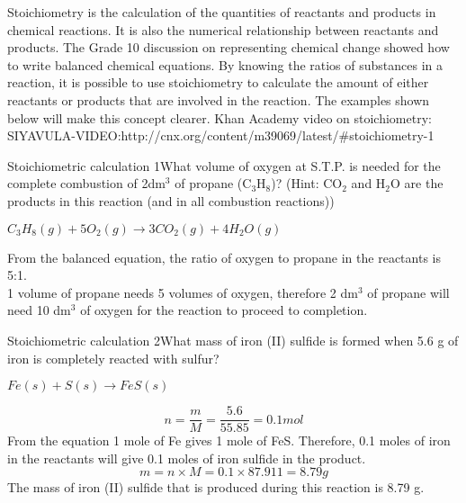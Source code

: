 Stoichiometry is the calculation of the quantities of reactants and products in chemical reactions. It is also the numerical relationship between reactants and products. The Grade 10 discussion on representing chemical change%
 showed how to write balanced chemical equations. By knowing the ratios of substances in a reaction, it is possible to use stoichiometry to calculate the amount of either reactants or products that are involved in the reaction. The examples shown below will make this concept clearer.
Khan Academy video on stoichiometry: SIYAVULA-VIDEO:http://cnx.org/content/m39069/latest/#stoichiometry-1
\begin{wex}{Stoichiometric calculation 1}{What volume of oxygen at S.T.P. is needed for the complete combustion of 2dm$^{3}$ of propane (C$_{3}$H$_{8}$)? (Hint: CO$_{2}$ and H$_{2}$O are the products in this reaction (and in all combustion reactions))\\}

{
\begin{center}
\rm${C_{3}H_{8}(g) + 5O_{2}(g) \rightarrow 3CO_{2}(g) + 4H_{2}O(g)}$\\
\end{center}


From the balanced equation, the ratio of oxygen to propane in the reactants is 5:1. \\

1 volume of propane needs 5 volumes of oxygen, therefore 2 dm$^{3}$ of propane will need 10 dm$^{3}$ of oxygen for the reaction to proceed to completion.}
\end{wex}

\begin{wex}{Stoichiometric calculation 2}{What mass of iron (II) sulfide is formed when 5.6 g of iron is completely reacted with sulfur?\\}
{
\begin{center}
\rm${Fe(s) + S(s) \rightarrow FeS(s)}$
\end{center}

\begin{equation*}
n = \frac{m}{M} = \frac{5.6}{55.85} = 0.1 mol
\end{equation*}
From the equation 1 mole of Fe gives 1 mole of FeS. Therefore, 0.1 moles of iron in the reactants will give 0.1 moles of iron sulfide in the product.\\
\begin{equation*}
m = n \times M = 0.1 \times 87.911 = 8.79 g
\end{equation*}
The mass of iron (II) sulfide that is produced during this reaction is 8.79 g.}
\end{wex}

